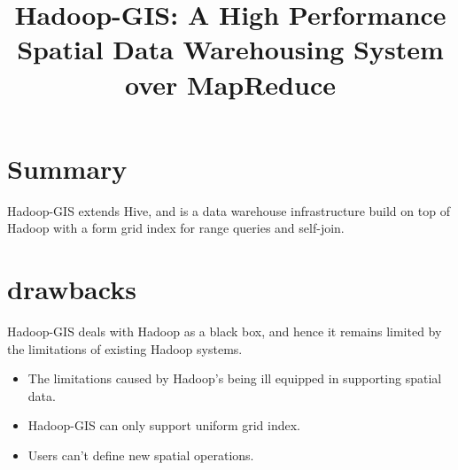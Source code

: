 \documentclass[conference]{IEEEtran}
\begin{document}
	\title{Hadoop-GIS: A High Performance Spatial Data Warehousing System over MapReduce}	
	\maketitle
	\IEEEpeerreviewmaketitle	
	\section{Summary}
	Hadoop-GIS extends Hive, and  is a data warehouse infrastructure build on top of Hadoop with a form grid index for range queries and self-join.
	\section{drawbacks}
	Hadoop-GIS deals with Hadoop as a black box, and hence it remains limited by the limitations of existing Hadoop systems.
	\begin{itemize}
		\item The limitations caused by Hadoop's being ill equipped in supporting spatial data.
		\item Hadoop-GIS can only support uniform grid index.
		\item Users can't define new spatial operations.				
	\end{itemize}
\end{document}
